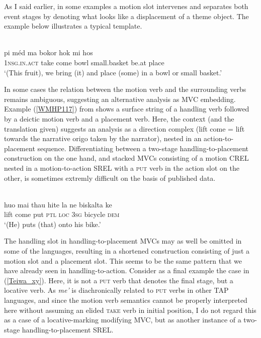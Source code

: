 As I said earlier, in some examples a motion slot intervenes and separates both event stages by denoting what looks like a displacement of a theme object. The  example below illustrates a typical template.

\ea 
{}\\
\gll pi méd ma bokor hok mi hos \\
\textsc{1}\textsc{nsg}.\textsc{in}.\textsc{act} take come bowl small.basket be.at place \\
\glft `(This fruit), we bring (it) and place (some) in a bowl or small basket.'\\ 
\z

In some cases the relation between the motion verb and the surrounding verbs remains ambiguous, suggesting an alternative analysis as MVC embedding. Example (\ref{WMHP117}) from  shows a surface string of a handling verb followed by a deictic motion verb and a placement verb. Here, the context (and the translation given) suggests an analysis as a direction complex  (lift come = lift towards the narrative origo taken by the narrator), nested in an action-to-placement sequence. Differentiating between a two-stage handling-to-placement construction on the one hand, and stacked MVCs consisting of a motion CREL nested in a motion-to-action SREL with a \textsc{put} verb in the action slot on the other, is sometimes extremly difficult on the basis of published data.

\ea \label{WMHP117}
\\
\gll huo mai thau hite la ne biskalta ke \\
lift come put \textsc{ptl} \textsc{loc} \textsc{3}\textsc{sg} bicycle \textsc{dem} \\
\glft `(He) puts (that) onto his bike.'\\ 
\z

The handling slot in handling-to-placement MVCs may as well be omitted in some of the languages, resulting in a shortened construction consisting of just a motion slot and a placement slot. This seems to be the same pattern that we have already seen in handling-to-action. Consider as a final example the  case in (\ref{Teiwa_xy}). Here, it is not a \textsc{put} verb that denotes the final stage, but a locative verb. As \textit{me'} is diachronically related to \textsc{put} verbs in other TAP languages, and since the motion verb semantics cannot be properly interpreted here without assuming an elided \textsc{take} verb in initial position, I do not regard this as a case of a locative-marking modifying MVC, but as another instance of a two-stage handling-to-placement SREL.

